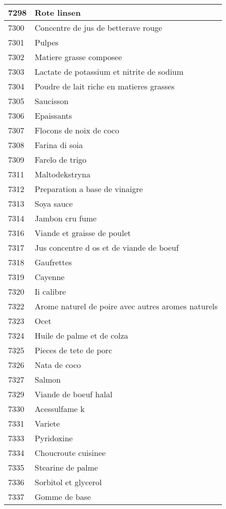 \begin{longtable}{|l|l|}
7298 & Rote linsen \\ \hline 
7300 & Concentre de jus de betterave rouge \\ \hline 
7301 & Pulpes \\ \hline 
7302 & Matiere grasse composee \\ \hline 
7303 & Lactate de potassium et nitrite de sodium \\ \hline 
7304 & Poudre de lait riche en matieres grasses \\ \hline 
7305 & Saucisson \\ \hline 
7306 & Epaissants \\ \hline 
7307 & Flocons de noix de coco \\ \hline 
7308 & Farina di soia \\ \hline 
7309 & Farelo de trigo \\ \hline 
7311 & Maltodekstryna \\ \hline 
7312 & Preparation a base de vinaigre \\ \hline 
7313 & Soya sauce \\ \hline 
7314 & Jambon cru fume \\ \hline 
7316 & Viande et graisse de poulet \\ \hline 
7317 & Jus concentre d os et de viande de boeuf \\ \hline 
7318 & Gaufrettes \\ \hline 
7319 & Cayenne \\ \hline 
7320 & Ii calibre \\ \hline 
7322 & Arome naturel de poire avec autres aromes naturels \\ \hline 
7323 & Ocet \\ \hline 
7324 & Huile de palme et de colza \\ \hline 
7325 & Pieces de tete de porc \\ \hline 
7326 & Nata de coco \\ \hline 
7327 & Salmon \\ \hline 
7329 & Viande de boeuf halal \\ \hline 
7330 & Acessulfame k \\ \hline 
7331 & Variete \\ \hline 
7333 & Pyridoxine \\ \hline 
7334 & Choucroute cuisinee \\ \hline 
7335 & Stearine de palme \\ \hline 
7336 & Sorbitol et glycerol \\ \hline 
7337 & Gomme de base \\ \hline 

\end{longtable}

